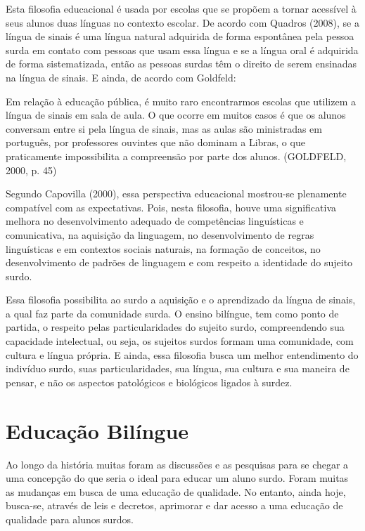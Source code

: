 \documentclass[brasil]{abnt}
\begin{document}
			Esta filosofia educacional é usada por escolas que se propõem a tornar acessível à seus alunos duas línguas no contexto escolar. De acordo com Quadros (2008), se a língua de sinais é uma língua 
			natural adquirida de forma espontânea pela pessoa surda em contato com pessoas que usam essa língua e se a língua oral é adquirida de forma sistematizada, então as pessoas surdas têm o direito de 
			serem ensinadas na língua de sinais. E ainda, de acordo com Goldfeld:
			
				\begin{citacao} Em relação à educação pública, é muito raro encontrarmos escolas que utilizem a língua de sinais em sala de aula. O que ocorre em muitos casos é que os alunos conversam entre 
								si pela língua de sinais, mas as aulas são ministradas em português, por professores ouvintes que não dominam a Libras, o que praticamente impossibilita a compreensão por parte
								dos alunos. (GOLDFELD, 2000, p. 45)
				\end{citacao}
			
			Segundo Capovilla (2000), essa perspectiva educacional mostrou-se plenamente compatível com as expectativas. Pois, nesta filosofia, houve uma significativa melhora no desenvolvimento adequado de 
			competências linguísticas e comunicativa, na aquisição da linguagem, no desenvolvimento de regras linguísticas e em contextos sociais naturais, na formação de conceitos, no desenvolvimento de 
			padrões de linguagem e com respeito a identidade do sujeito surdo.  
			
			Essa filosofia possibilita ao surdo a aquisição e o aprendizado da língua de sinais, a qual faz parte da comunidade surda. O ensino bilíngue, tem como ponto de partida, o respeito pelas 
			particularidades do sujeito surdo, compreendendo sua capacidade intelectual, ou seja, os sujeitos surdos formam uma comunidade, com cultura e língua própria. E ainda, essa filosofia busca um melhor 
			entendimento do indivíduo surdo, suas particularidades, sua língua, sua cultura e sua maneira de pensar, e não os aspectos patológicos e biológicos ligados à surdez.
			
\chapter{Educação Bilíngue}
	Ao longo da história muitas foram as discussões e as pesquisas para se chegar a uma concepção do que seria o ideal para educar um aluno surdo. Foram muitas as 
	mudanças em busca de uma educação de qualidade. No entanto, ainda hoje, busca-se, através de leis e decretos, aprimorar e dar acesso a uma educação de qualidade para alunos surdos. 
			
\end{document}
